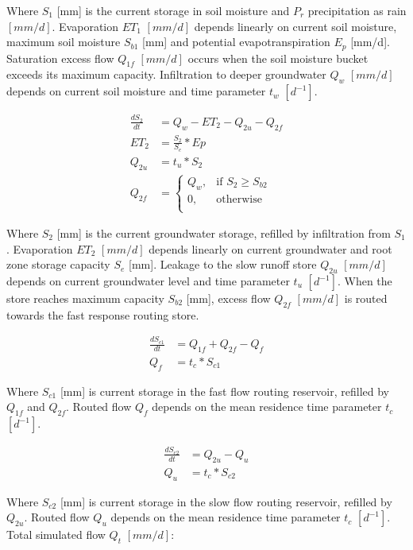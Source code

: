 {} %

Where $S_1$ [mm] is the current storage in soil moisture and $P_r$ precipitation as rain $[mm/d]$. Evaporation $ET_1$ $[mm/d]$ depends linearly on current soil moisture, maximum soil moisture $S_{b1}$ [mm] and potential evapotranspiration $E_p$ [mm/d]. Saturation excess flow $Q_{1f}$  $[mm/d]$ occurs when the soil moisture bucket exceeds its maximum capacity. Infiltration to deeper groundwater $Q_w$  $[mm/d]$ depends on current soil moisture and time parameter $t_w$  $[d^{-1}]$.

\begin{align}
	\frac{dS_2}{dt} &= Q_w-ET_2-Q_{2u} - Q_{2f}\\
	ET_2 &= \frac{S_2}{S_{e}}*Ep\\
	Q_{2u} &= t_u*S_2\\
	Q_{2f} &= \begin{cases}
		Q_w, &\text{if } S_2 \geq S_{b2} \\
		0, & \text{otherwise} \\
	\end{cases}
\end{align}

Where $S_2$ [mm] is the current groundwater storage, refilled by infiltration from $S_1$. Evaporation $ET_2$ $[mm/d]$ depends linearly on current groundwater and root zone storage capacity $S_e$ [mm]. Leakage to the slow runoff store $Q_{2u}$ $[mm/d]$ depends on current groundwater level and time parameter $t_u$ $[d^{-1}]$. When the store reaches maximum capacity $S_{b2}$ [mm], excess flow $Q_{2f}$ $[mm/d]$ is routed towards the fast response routing store.

\begin{align}
	\frac{dS_{c1}}{dt} &= Q_{1f}+Q_{2f}-Q_{f}\\
	Q_f &= t_c*S_{c1}
\end{align}

Where $S_{c1}$ [mm] is current storage in the fast flow routing reservoir, refilled by $Q_{1f}$ and $Q_{2f}$. Routed flow $Q_f$ depends on the mean residence time parameter $t_c$ $[d^{-1}]$.

\begin{align}
	\frac{dS_{c2}}{dt} &= Q_{2u}-Q_{u}\\
	Q_u &= t_c*S_{c2}
\end{align}

Where $S_{c2}$ [mm] is current storage in the slow flow routing reservoir, refilled by $Q_{2u}$. Routed flow $Q_u$ depends on the mean residence time parameter $t_c$ $[d^{-1}]$. Total simulated flow $Q_t$ $[mm/d]$:

